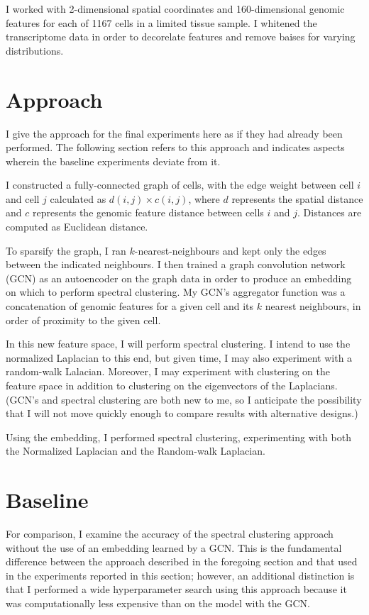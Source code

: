 \documentclass{article}
\newcommand{\nData}{1167}
\begin{document}
I worked with 2-dimensional spatial coordinates and 160-dimensional genomic features for each of \nData{} cells in a limited tissue sample. I whitened the transcriptome data in order to decorelate features and remove baises for varying distributions.


\section{Approach}

I give the approach for the final experiments here as if they had already been performed. The following section refers to this approach and indicates aspects wherein the baseline experiments deviate from it.

I constructed a fully-connected graph of cells, with the edge weight between cell $i$ and cell $j$ calculated as $d(i,j)\times c(i,j)$, where $d$ represents the spatial distance and $c$ represents the genomic feature distance between cells $i$ and $j$. Distances are computed as Euclidean distance.

To sparsify the graph, I ran $k$-nearest-neighbours and kept only the edges between the indicated neighbours. I then trained a graph convolution network (GCN) as an autoencoder on the graph data in order to produce an embedding on which to perform spectral clustering. My GCN's aggregator function was a concatenation of genomic features for a given cell and its $k$ nearest neighbours, in order of proximity to the given cell.

In this new feature space, I will perform spectral clustering. I intend to use the normalized Laplacian to this end, but given time, I may also experiment with a random-walk Lalacian. Moreover, I may experiment with clustering on the feature space in addition to clustering on the eigenvectors of the Laplacians. (GCN's and spectral clustering are both new to me, so I anticipate the possibility that I will not move quickly enough to compare results with alternative designs.)

Using the embedding, I performed spectral clustering, experimenting with both the Normalized Laplacian and the Random-walk Laplacian.

\section{Baseline}

For comparison, I examine the accuracy of the spectral clustering approach without the use of an embedding learned by a GCN. This is the fundamental difference between the approach described in the foregoing section and that used in the experiments reported in this section; however, an additional distinction is that I performed a wide hyperparameter search using this approach because it was computationally less expensive than on the model with the GCN.
\end{document}
